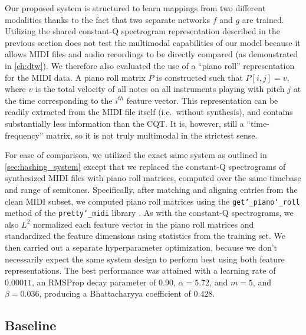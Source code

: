 Our proposed system is structured to learn mappings from two different modalities thanks to the fact that two separate networks $f$ and $g$ are trained.
Utilizing the shared constant-Q spectrogram representation described in the previous section does not test the multimodal capabilities of our model because it allows MIDI files and audio recordings to be directly compared (as demonstrated in \cref{ch:dtw}).
We therefore also evaluated the use of a ``piano roll'' representation for the MIDI data.
A piano roll matrix $P$ is constructed such that $P[i, j] = v$, where $v$ is the total velocity of all notes on all instruments playing with pitch $j$ at the time corresponding to the $i^{th}$ feature vector.
This representation can be readily extracted from the MIDI file itself (i.e.\ without synthesis), and contains substantially less information than the CQT.
It is, however, still a ``time-frequency'' matrix, so it is not truly multimodal in the strictest sense.

For ease of comparison, we utilized the exact same system as outlined in \cref{sec:hashing_system} except that we replaced the constant-Q spectrograms of synthesized MIDI files with piano roll matrices, computed over the same timebase and range of semitones.
Specifically, after matching and aligning entries from the clean MIDI subset, we computed piano roll matrices using the \texttt{get\char`_piano\char`_roll} method of the \texttt{pretty\char`_midi} library \cite{raffel2014pretty_midi}.
As with the constant-Q spectrograms, we also $L^2$ normalized each feature vector in the piano roll matrices and standardized the feature dimensions using statistics from the training set.
We then carried out a separate hyperparameter optimization, because we don't necessarily expect the same system design to perform best using both feature representations.
The best performance was attained with a learning rate of $0.00011$, an RMSProp decay parameter of $0.90$, $\alpha = 5.72$, and $m = 5$, and $\beta = 0.036$, producing a Bhattacharyya coefficient of $0.428$.

\subsection{Baseline}
\label{sec:baseline}

